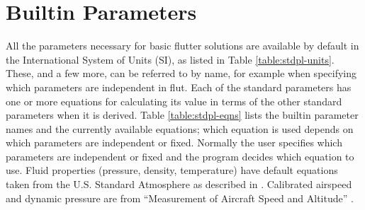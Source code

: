 \documentclass[11pt,openany,twoside]{book}
\numberwithin{equation}{section}		%
\newcommand{\Cmd}[1]{{\sf #1}}
\newcommand{\Tableref}[1]{Table \ref{#1}}
\begin{document}
\section{Builtin Parameters}\label{sect:predef}
All the parameters necessary for basic flutter solutions are available by
default in the International System of Units (SI),
as listed in \Tableref{table:stdpl-units}.
These, and a few more, can be referred to by name, for example
when specifying which parameters are independent in \Cmd{flut}.
Each of the standard parameters has one or more equations
for calculating its value in terms of the other standard parameters
when it is derived.
\Tableref{table:stdpl-eqns} lists the builtin parameter names and
the currently available equations; which equation is
used depends on which parameters are independent or fixed. Normally the
user specifies which parameters are independent or fixed and the program
decides which equation to use.
Fluid properties (pressure, density, temperature) have default equations taken
from the U.S. Standard Atmosphere as described in \cite{united1976us}.
Calibrated airspeed and dynamic pressure are from
``Measurement of Aircraft Speed and Altitude'' \cite{gracey1980measurement}.
\end{document}
